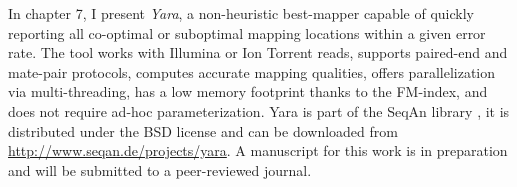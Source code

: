 In chapter 7, I present \emph{Yara}, a non-heuristic best-mapper capable of quickly reporting all co-optimal or suboptimal mapping locations within a given error rate.
The tool works with Illumina or Ion Torrent reads, supports paired-end and mate-pair protocols, computes accurate mapping qualities, offers parallelization via multi-threading, has a low memory footprint thanks to the FM-index, and does not require ad-hoc parameterization.
Yara is part of the SeqAn library \citep{Doering2008}, it is distributed under the BSD license and can be downloaded from \url{http://www.seqan.de/projects/yara}.
A manuscript for this work is in preparation and will be submitted to a peer-reviewed journal.

